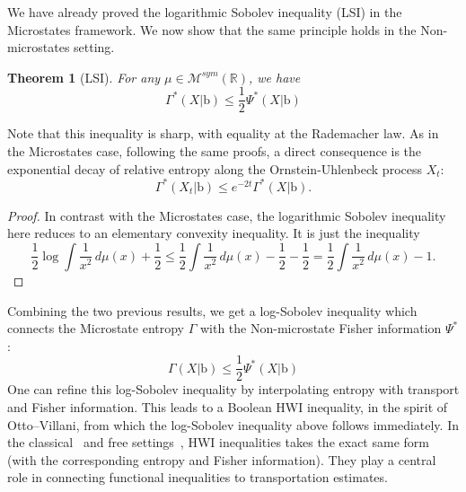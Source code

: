 \documentclass[10pt, reqno]{amsart}
\numberwithin{equation}{section}
\theoremstyle{definition}
\theoremstyle{plain}
\newtheorem{theorem}[definition]{Theorem}
\theoremstyle{remark}
\newcommand{\R}{\mathbb{R}}
\newcommand{\1}{\mathbbm{1}}
\begin{document}
We have already proved the logarithmic Sobolev inequality (LSI) in the Microstates
framework. We now show that the same principle holds in the Non-microstates
setting.
\begin{theorem}[LSI]\label{thm:nmLSI}
		For any $\mu\in\mathcal{M}^{sym}(\R)$, we have
	\begin{equation*}
		\Gamma^*(X|\mathbb{\mathrm{b}})\leq \frac{1}{2}\Psi^*(X|\mathbb{\mathrm{b}})
	\end{equation*}
	\end{theorem}
    Note that this inequality is sharp, with equality at the Rademacher law. As in the Microstates case, following the same proofs, a direct consequence is the exponential decay of relative entropy along the Ornstein-Uhlenbeck process $X_t$:
    			\begin{equation*}
				 \Gamma^*(X_t| \mathbb{\mathrm{b}})\le e^{-2t} \Gamma^*(X| \mathbb{\mathrm{b}}).
			\end{equation*}
    \begin{proof}
    In contrast with the Microstates case, the logarithmic Sobolev inequality
here reduces to an elementary convexity inequality.    It is just the inequality $$\frac{1}{2}\log \int \frac{1}{x^2}\,d\mu(x)+\frac{1}{2}\leq\frac{1}{2}  \int \frac{1}{x^2}\,d\mu(x)-\frac{1}{2}-\frac{1}{2}= \frac{1}{2}  \int \frac{1}{x^2}\,d\mu(x)-1.$$
    \end{proof}
 

Combining the two previous results, we get a log-Sobolev inequality which connects the Microstate entropy $\Gamma$ with the Non-microstate Fisher information $\Psi^*$:
\begin{equation*}\label{LSI:cross}
		\Gamma(X|\mathbb{\mathrm{b}})\leq \frac{1}{2}\Psi^*(X|\mathbb{\mathrm{b}})
	\end{equation*}
One can refine this log-Sobolev inequality by interpolating entropy with transport and Fisher information. This leads to a Boolean HWI inequality, in the spirit of Otto–Villani, from which the log-Sobolev inequality above follows immediately.
In the classical~\cite{otto2000generalization} and free settings~\cite{popescu2013local}, HWI inequalities takes the exact same form (with the corresponding entropy and Fisher information). They play a central role in connecting functional inequalities to transportation estimates.
\end{document}
